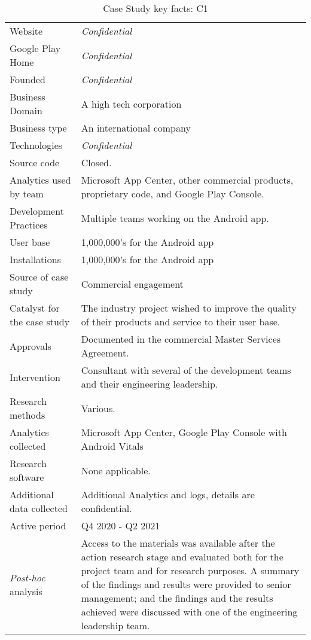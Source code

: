 \begin{table*}[h]
    \centering
    \renewcommand{\arraystretch}{0.8}%
    \small
    \setlength{\tabcolsep}{6pt}
    \begin{tabular}{lp{9cm}}
       \toprule
       Website &\textit{Confidential} \\
       Google Play Home & \textit{Confidential} \\
       Founded & \textit{Confidential} \\
       Business Domain & A high tech corporation \\
       Business type & An international company \\
       Technologies  & \textit{Confidential} \\
       Source code  &Closed. \\
       Analytics used by team & Microsoft App Center, other commercial products, proprietary code, and Google Play Console. \\
       Development Practices & Multiple teams working on the Android app. \\
       \midrule
       User base & 1,000,000's for the Android app \\
       Installations & 1,000,000's for the Android app \\
       \midrule
       Source of case study &Commercial engagement \\
       Catalyst for the case study &The industry project wished to improve the quality of their products and service to their user base. \\
       Approvals &Documented in the commercial Master Services Agreement. \\
       \midrule
       Intervention &Consultant with several of the development teams and their engineering leadership. \\
       Research methods &Various. \\
       Analytics collected &Microsoft App Center, Google Play Console with Android Vitals \\
       Research software & None applicable. \\
       Additional data collected &Additional Analytics and logs, details are confidential. \\
       Active period & Q4 2020 - Q2 2021 \\
       \midrule
       \emph{Post-hoc} analysis & Access to the materials was available after the action research stage and evaluated both for the project team and for research purposes. A summary of the findings and results were provided to senior management; and the findings and the results achieved were discussed with one of the engineering leadership team. \\
       \bottomrule
    \end{tabular}
    \caption{Case Study key facts: C1}
    \label{tab:commercial_case_study_anaytics_overview}
\end{table*}

